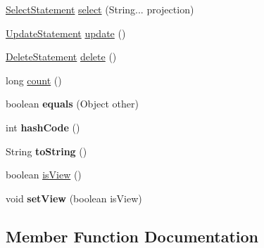 \begin{DoxyCompactItemize}
\item 
\mbox{\hyperlink{interfacecom_1_1mysql_1_1cj_1_1xdevapi_1_1_select_statement}{Select\+Statement}} \mbox{\hyperlink{classcom_1_1mysql_1_1cj_1_1xdevapi_1_1_table_impl_a048429d90cca804cd60ce9a49f5b12fd}{select}} (String... projection)
\item 
\mbox{\hyperlink{interfacecom_1_1mysql_1_1cj_1_1xdevapi_1_1_update_statement}{Update\+Statement}} \mbox{\hyperlink{classcom_1_1mysql_1_1cj_1_1xdevapi_1_1_table_impl_a4f6da4761f5ff7becb0737c11b0ea0db}{update}} ()
\item 
\mbox{\hyperlink{interfacecom_1_1mysql_1_1cj_1_1xdevapi_1_1_delete_statement}{Delete\+Statement}} \mbox{\hyperlink{classcom_1_1mysql_1_1cj_1_1xdevapi_1_1_table_impl_ab12665d608984e6774957947f6a22c7c}{delete}} ()
\item 
long \mbox{\hyperlink{classcom_1_1mysql_1_1cj_1_1xdevapi_1_1_table_impl_a855ae05acfd531e69738a8a88824fe8c}{count}} ()
\item 
\mbox{\label{classcom_1_1mysql_1_1cj_1_1xdevapi_1_1_table_impl_a0f66e0bb59cb1537222b61858537daa3}} 
boolean {\bfseries equals} (Object other)
\item 
\mbox{\label{classcom_1_1mysql_1_1cj_1_1xdevapi_1_1_table_impl_aeba962a3af205b868ef18847f8f166a8}} 
int {\bfseries hash\+Code} ()
\item 
\mbox{\label{classcom_1_1mysql_1_1cj_1_1xdevapi_1_1_table_impl_aa7bfb3a165db21c34060c5cbb6b111b2}} 
String {\bfseries to\+String} ()
\item 
boolean \mbox{\hyperlink{classcom_1_1mysql_1_1cj_1_1xdevapi_1_1_table_impl_a92b2db897ad5ce4f950422956bfc4027}{is\+View}} ()
\item 
\mbox{\label{classcom_1_1mysql_1_1cj_1_1xdevapi_1_1_table_impl_ae3b7e58d7a85393a4d2baf8115acf90c}} 
void {\bfseries set\+View} (boolean is\+View)
\end{DoxyCompactItemize}


\subsection{Member Function Documentation}
\mbox{\label{classcom_1_1mysql_1_1cj_1_1xdevapi_1_1_table_impl_a855ae05acfd531e69738a8a88824fe8c}} 
